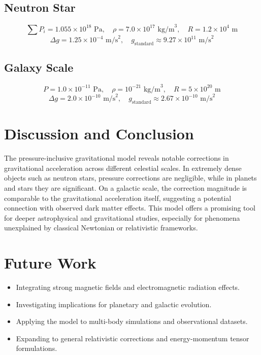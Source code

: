 \documentclass[12pt,a4paper]{article}
\begin{document}
\subsection{Neutron Star}
\[
\sum P_i = 1.055 \times 10^{18} \text{ Pa}, \quad \rho = 7.0 \times 10^{17} \text{ kg/m}^3, \quad R = 1.2 \times 10^{4} \text{ m}
\]
\[
\Delta g = 1.25 \times 10^{-4} \text{ m/s}^2, \quad g_{\text{standard}} \approx 9.27 \times 10^{11} \text{ m/s}^2
\]

\subsection{Galaxy Scale}
\[
P = 1.0 \times 10^{-11} \text{ Pa}, \quad \rho = 10^{-21} \text{ kg/m}^3, \quad R = 5 \times 10^{20} \text{ m}
\]
\[
\Delta g = 2.0 \times 10^{-10} \text{ m/s}^2, \quad g_{\text{standard}} \approx 2.67 \times 10^{-10} \text{ m/s}^2
\]

\section{Discussion and Conclusion}
The pressure-inclusive gravitational model reveals notable corrections in gravitational acceleration across different celestial scales. In extremely dense objects such as neutron stars, pressure corrections are negligible, while in planets and stars they are significant. On a galactic scale, the correction magnitude is comparable to the gravitational acceleration itself, suggesting a potential connection with observed dark matter effects. This model offers a promising tool for deeper astrophysical and gravitational studies, especially for phenomena unexplained by classical Newtonian or relativistic frameworks.

\section{Future Work}
\begin{itemize}
    \item Integrating strong magnetic fields and electromagnetic radiation effects.
    \item Investigating implications for planetary and galactic evolution.
    \item Applying the model to multi-body simulations and observational datasets.
    \item Expanding to general relativistic corrections and energy-momentum tensor formulations.
\end{itemize}
\end{document}
